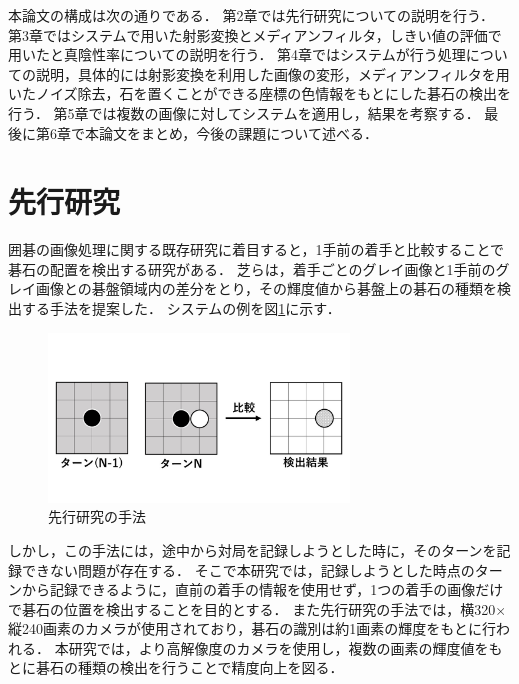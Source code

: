 \documentclass[openright]{nitocs}
\numberwithin{equation}{section}
\begin{document}
        本論文の構成は次の通りである．
        第2章では先行研究についての説明を行う．
        第3章ではシステムで用いた射影変換とメディアンフィルタ，しきい値の評価で用いたと真陰性率についての説明を行う．
        第4章ではシステムが行う処理についての説明，具体的には射影変換を利用した画像の変形，メディアンフィルタを用いたノイズ除去，石を置くことができる座標の色情報をもとにした碁石の検出を行う．
        第5章では複数の画像に対してシステムを適用し，結果を考察する．
        最後に第6章で本論文をまとめ，今後の課題について述べる．

    \section{先行研究} %
        囲碁の画像処理に関する既存研究に着目すると，1手前の着手と比較することで碁石の配置を検出する研究がある．
        芝らは，着手ごとのグレイ画像と1手前のグレイ画像との碁盤領域内の差分をとり，その輝度値から碁盤上の碁石の種類を検出する手法を提案した\cite{PilotStudy}．
        システムの例を図\ref{PS_img}に示す．
        \begin{figure}[tb] %
            \begin{center}
            \includegraphics[clip,width=80mm]{PilotStudy_image.jpg} 
            \caption{先行研究の手法}
            \label{PS_img}
            \end{center}
        \end{figure}

        しかし，この手法には，途中から対局を記録しようとした時に，そのターンを記録できない問題が存在する．
        そこで本研究では，記録しようとした時点のターンから記録できるように，直前の着手の情報を使用せず，1つの着手の画像だけで碁石の位置を検出することを目的とする．
        また先行研究の手法では，横320$\times$縦240画素のカメラが使用されており，碁石の識別は約1画素の輝度をもとに行われる．
        本研究では，より高解像度のカメラを使用し，複数の画素の輝度値をもとに碁石の種類の検出を行うことで精度向上を図る．
\end{document}
